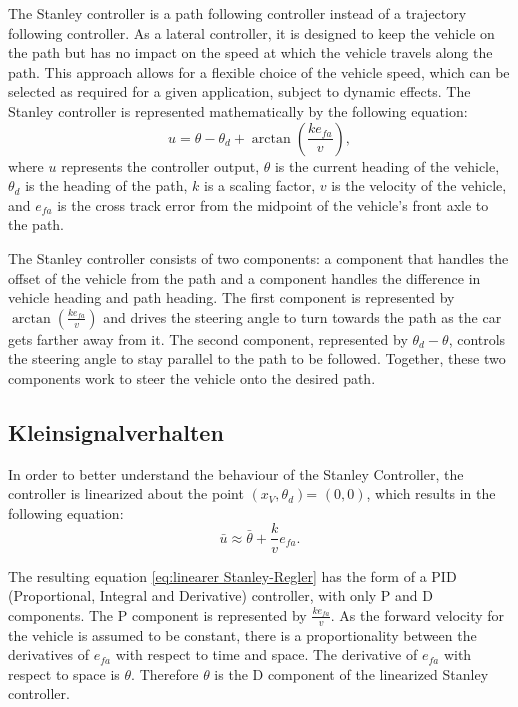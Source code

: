 \documentclass[arbeit=studie,oneside,BCOR=12mm]{ArbeitRST}
\begin{document}
The Stanley controller is a path following controller instead of a trajectory
following controller. As a lateral controller, it is designed to keep the
vehicle on the path but has no impact on the speed at which the vehicle travels
along the path. This approach allows for a flexible choice of the vehicle
speed, which can be selected as required for a given application, subject to
dynamic effects. The Stanley controller is represented mathematically by the
following equation: \begin{equation} u = \theta - \theta_d +
\arctan\left(\frac{ke_{fa}}{v}\right), \label{eq:Stanley-Regler} \end{equation}
where $u$ represents the controller output, $\theta$ is the current heading of
the vehicle, $\theta_d$ is the heading of the path, $k$ is a scaling factor,
$v$ is the velocity of the vehicle, and $e_{fa}$ is the cross track error from
the midpoint of the vehicle's front axle to the path.

The Stanley controller consists of two components: a component that handles the
offset of the vehicle from the path and a component handles the difference in
vehicle heading and path heading. The first component is represented by
$\arctan(\frac{ke_{fa}}{v})$ and drives the steering angle to turn towards the
path as the car gets farther away from it. The second component, represented by
$\theta_d - \theta$, controls the steering angle to stay parallel to the path
to be followed. Together, these two components work to steer the vehicle onto
the desired path.

\subsection{Kleinsignalverhalten}

In order to better understand the behaviour of the Stanley Controller, the
controller is linearized about the point \(\left(x_V, \theta_d\right)\)=
\(\left(0, 0\right)\), which results in the following equation:
\begin{equation} 
    \bar{u} \approx \bar{\theta} + \frac{k}{v}e_{fa}.
    \label{eq:linearer Stanley-Regler} 
\end{equation}

The resulting equation \eqref{eq:linearer Stanley-Regler} has the form of a PID
(Proportional, Integral and Derivative) controller, with only P and D
components. The P component is represented by \(\frac{ke_{fa}}{v}\). As the
forward velocity for the vehicle is assumed to be constant, there is a
proportionality between the derivatives of \(e_{fa}\) with respect to time and
space. The derivative of \(e_{fa}\) with respect to space is \(\theta\).
Therefore \(\theta\) is the D component of the linearized Stanley controller.
\end{document}

